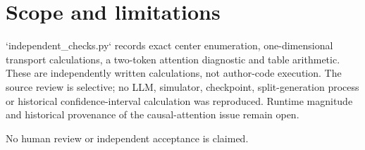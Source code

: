 \documentclass[10pt]{article}
\begin{document}
\section*{Scope and limitations}
`independent\_checks.py` records exact center enumeration, one-dimensional transport calculations, a two-token attention diagnostic and table arithmetic. These are independently written calculations, not author-code execution. The source review is selective; no LLM, simulator, checkpoint, split-generation process or historical confidence-interval calculation was reproduced. Runtime magnitude and historical provenance of the causal-attention issue remain open.\par
No human review or independent acceptance is claimed.\par
\end{document}
